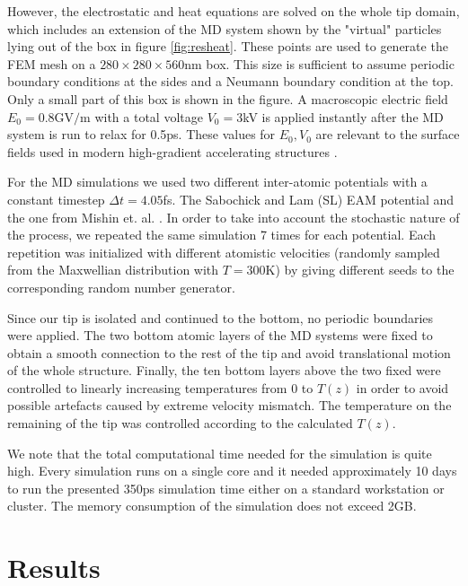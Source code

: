 \documentclass[%
 aps,
 prb,%
 amsmath,amssymb,
reprint,%
superscriptaddress,
]{revtex4-1}
\begin{document}
However, the electrostatic and heat equations are solved on the whole tip domain, which includes an extension of the MD system shown by the "virtual" particles lying out of the box in figure \ref{fig:resheat}. These points are used to generate the FEM mesh on a $280 \times 280  \times 560$nm box.
This size is sufficient to assume periodic boundary conditions at the sides and a Neumann boundary condition at the top. 
Only a small part of this box is shown in the figure. A macroscopic electric field $E_{0} = 0.8\textrm{GV/m}$ with a total voltage $V_{0} = 3$kV is applied instantly after the MD system is run to relax for 0.5ps. These values for $E_0,V_0$ are relevant to the surface fields used in modern high-gradient accelerating structures \cite{Degiovani_conditioning,Wu_high-gradient}. 

For the MD simulations we used two different inter-atomic potentials with a constant timestep $\Delta t = 4.05$fs. The Sabochick and Lam (SL) EAM potential \cite{SL_EAM_CU} and the one from Mishin et. al. \cite{Mishin}. In order to take into account the stochastic nature of the process, we repeated the same simulation 7 times for each potential. 
Each repetition was initialized with different atomistic velocities (randomly sampled from the Maxwellian distribution with $T=300\textrm{K}$) by giving different seeds to the corresponding random number generator.

Since our tip is isolated and continued to the bottom, no periodic boundaries were applied. The two bottom atomic layers of the MD systems were fixed to obtain a smooth connection to the rest of the tip and avoid translational motion of the whole structure. Finally, the ten bottom layers above the two fixed were controlled to linearly increasing temperatures from 0 to $T(z)$ in order to avoid possible artefacts caused by extreme velocity mismatch. The temperature on the remaining of the tip was controlled according to the calculated $T(z)$.

We note that the total computational time needed for the simulation is quite high. Every simulation runs on a single core and it needed approximately 10 days to run the presented 350ps simulation time either on a standard workstation or cluster. The memory consumption of the simulation does not exceed 2GB.  

\section{Results} \label{sec:results}
\end{document}
